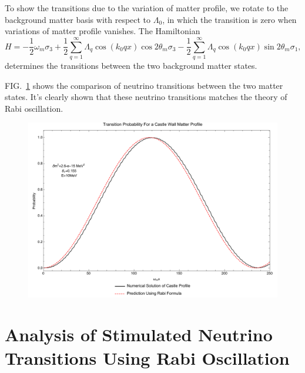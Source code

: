 \documentclass[%
preprint,
 amsmath,amssymb,
 aps,
]{revtex4-1}
\begin{document}
To show the transitions due to the variation of matter profile, we rotate to the background matter basis with respect to $\Lambda_0$, in which the transition is zero when variations of matter profile vanishes. The Hamiltonian
\begin{equation}
H = - \frac{1}{2}\omega_m \sigma_3  + \frac{1}{2} \sum_{q=1}^{\infty} \Lambda_q \cos\left( k_0 q x \right) \cos 2\theta_m \sigma_3 - \frac{1}{2} \sum_{q=1}^{\infty} \Lambda_q \cos\left( k_0 q x \right) \sin 2\theta_m \sigma_1,
\end{equation}
determines the transitions between the two background matter states.


FIG.~\ref{fig-akhmedovOscPlt} shows the comparison of neutrino transitions between the two matter states. It's clearly shown that these neutrino transitions matches the theory of Rabi oscillation.

\begin{figure}[!htbp]
                \centering
                \includegraphics[width=\textwidth]{assets/akhmedovOscPlt}
                \caption{}
                \label{fig-akhmedovOscPlt}
\end{figure}










\section{\label{stimulated}Analysis of Stimulated Neutrino Transitions Using Rabi Oscillation}
\end{document}
